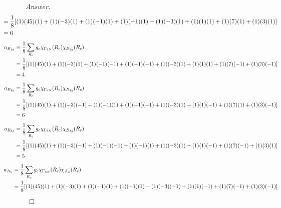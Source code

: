 \documentclass[../psets.tex]{subfiles}
\begin{document}
\begin{enumerate}[label={\Roman*)}]
\begin{enumerate}[label={\alph*)}]
\begin{proof}[Answer]
\begin{align*}
                \hspace{-4em}&= \frac{1}{8}[(1)(45)(1)+(1)(-3)(1)+(1)(-1)(1)+(1)(-1)(1)+(1)(-3)(1)+(1)(1)(1)+(1)(7)(1)+(1)(3)(1)]\\
                \hspace{-4em}&= 6
            \end{align*}
            \begin{align*}
                \hspace{-4em}a_{B_{1g}} &= \frac{1}{8}\sum_{R_c}g_c\chi_{\Gamma_{3N}}(R_c)\chi_{B_{1g}}(R_c)\\
                \hspace{-4em}&= \frac{1}{8}[(1)(45)(1)+(1)(-3)(1)+(1)(-1)(-1)+(1)(-1)(-1)+(1)(-3)(1)+(1)(1)(1)+(1)(7)(-1)+(1)(3)(-1)]\\
                \hspace{-4em}&= 4
            \end{align*}
            \begin{align*}
                \hspace{-4em}a_{B_{2g}} &= \frac{1}{8}\sum_{R_c}g_c\chi_{\Gamma_{3N}}(R_c)\chi_{B_{2g}}(R_c)\\
                \hspace{-4em}&= \frac{1}{8}[(1)(45)(1)+(1)(-3)(-1)+(1)(-1)(1)+(1)(-1)(-1)+(1)(-3)(1)+(1)(1)(-1)+(1)(7)(1)+(1)(3)(-1)]\\
                \hspace{-4em}&= 6
            \end{align*}
            \begin{align*}
                \hspace{-4em}a_{B_{3g}} &= \frac{1}{8}\sum_{R_c}g_c\chi_{\Gamma_{3N}}(R_c)\chi_{B_{3g}}(R_c)\\
                \hspace{-4em}&= \frac{1}{8}[(1)(45)(1)+(1)(-3)(-1)+(1)(-1)(-1)+(1)(-1)(1)+(1)(-3)(1)+(1)(1)(-1)+(1)(7)(-1)+(1)(3)(1)]\\
                \hspace{-4em}&= 5
            \end{align*}
            \begin{align*}
                \hspace{-4em}a_{A_u}    &= \frac{1}{8}\sum_{R_c}g_c\chi_{\Gamma_{3N}}(R_c)\chi_{A_u}(R_c)\\
                \hspace{-4em}&= \frac{1}{8}[(1)(45)(1)+(1)(-3)(1)+(1)(-1)(1)+(1)(-1)(1)+(1)(-3)(-1)+(1)(1)(-1)+(1)(7)(-1)+(1)(3)(-1)]\\

\end{align*}
\end{proof}
\end{enumerate}
\end{enumerate}
\end{document}

